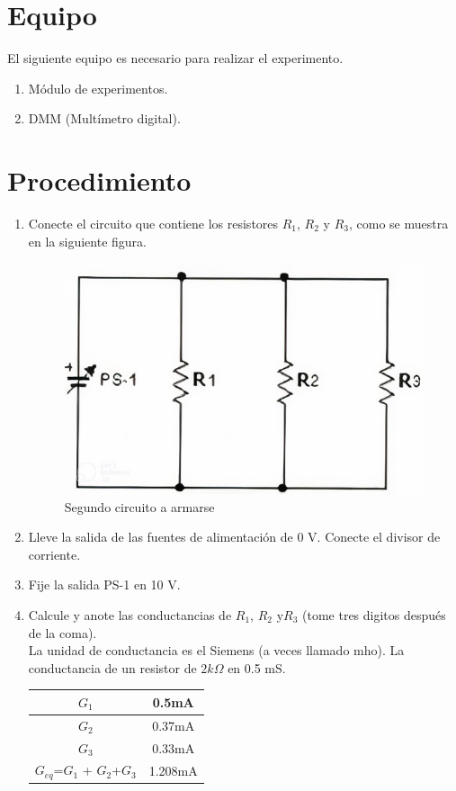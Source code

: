 \section{Equipo}
El siguiente equipo es necesario para realizar el experimento.
\begin{enumerate}
	\item Módulo de experimentos.
	\item DMM (Multímetro digital).
\end{enumerate}
\section{Procedimiento}
\begin{enumerate}
	\item Conecte el circuito que contiene los resistores $R_{1}$, $R_{2}$ y $R_{3}$, como se muestra en la siguiente figura. 
	\begin{figure}[h]
		\centering 
		\includegraphics[scale=0.5]{imagenes/5}
		\caption{Segundo circuito a armarse}
	\end{figure}
	\item Lleve la salida de las fuentes de alimentación de 0 V. Conecte el divisor de corriente.
	\item Fije la salida PS-1 en 10 V.
	\item Calcule y anote las conductancias de $R_{1}$, $R_{2}$ y$ R_{3}$ (tome tres digitos después de la coma).
	\\ La unidad de conductancia es el Siemens (a veces llamado mho). La  conductancia de un resistor de $2k\Omega$ en 0.5 mS.
\begin{table}[h]
	\centering
	
	\begin{tabular}{|c|c|}
		\hline
		$G_{1}$&0.5mA\\ \hline 
		$G_{2}$&0.37mA\\ \hline
		$G_{3}$&0.33mA\\ \hline
		$G_{eq}$=$G_{1}$ + $G_{2}$+$G_{3}$&1.208mA\\ \hline
		

\end{tabular}
\end{table}
\end{enumerate}
